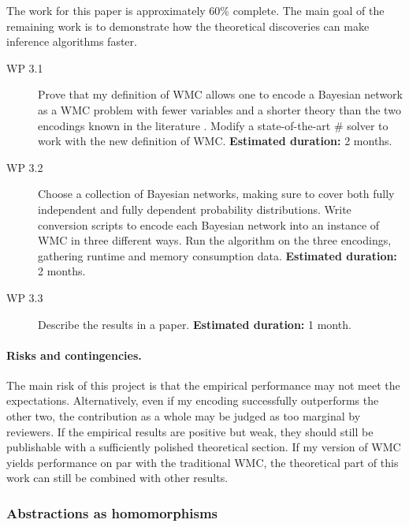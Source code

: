 \documentclass{article}
\begin{document}
The work for this paper is approximately 60\% complete. The main goal of the
remaining work is to demonstrate how the theoretical discoveries can make
inference algorithms faster.
\begin{description}
\item[WP 3.1] Prove that my definition of WMC allows one to encode a Bayesian
  network as a WMC problem with fewer variables and a shorter theory than the
  two encodings known in the literature
  \cite{DBLP:conf/kr/Darwiche02,DBLP:conf/aaai/SangBK05}. Modify a
  state-of-the-art \#\SAT{} solver to work with the new definition of WMC. {\bf
    Estimated duration:} 2 months.
\item[WP 3.2] Choose a collection of Bayesian networks, making sure to cover
  both fully independent and fully dependent probability distributions. Write
  conversion scripts to encode each Bayesian network into an instance of WMC in
  three different ways. Run the algorithm on the three encodings, gathering
  runtime and memory consumption data. {\bf Estimated duration:} 2 months.
\item[WP 3.3] Describe the results in a paper. {\bf Estimated duration:} 1
  month.
\end{description}

\paragraph{Risks and contingencies.} The main risk of this project is that the
empirical performance may not meet the expectations. Alternatively, even if my
encoding successfully outperforms the other two, the contribution as a whole may
be judged as too marginal by reviewers. If the empirical results are positive
but weak, they should still be publishable with a sufficiently polished
theoretical section. If my version of WMC yields performance on par with the
traditional WMC, the theoretical part of this work can still be combined with
other results.

\subsubsection{Abstractions as homomorphisms}
\end{document}
